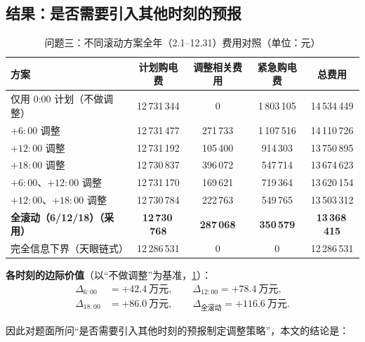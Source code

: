 \subsection{结果\nobreak：是否需要引入其他时刻的预报}

\begin{table}[htbp]
\centering
\caption{问题三\nobreak：不同滚动方案全年（2.1--12.31\nobreak）费用对照（单位\nobreak：元\nobreak）}
\label{tab:q3cmp}
\begin{tabular}{@{}lcccc@{}}
\toprule
方案 & 计划购电费 & 调整相关费用 & 紧急购电费 & 总费用 \\
\midrule
仅用 0:00 计划（不做调整\nobreak） & 12\,731\,344 & 0 & 1\,803\,105 & 14\,534\,449 \\
$+6{:}00$ 调整 & 12\,731\,477 & 271\,733 & 1\,107\,516 & 14\,110\,726 \\
$+12{:}00$ 调整 & 12\,731\,192 & 105\,400 & 914\,303 & 13\,750\,895 \\
$+18{:}00$ 调整 & 12\,730\,837 & 396\,072 & 547\,714 & 13\,674\,623 \\
$+6{:}00$\nobreak、$+12{:}00$ 调整 & 12\,731\,170 & 169\,621 & 719\,364 & 13\,620\,154 \\
$+12{:}00$\nobreak、$+18{:}00$ 调整 & 12\,730\,784 & 222\,763 & 549\,765 & 13\,503\,312 \\
\textbf{全滚动（6/12/18\nobreak）（采用\nobreak）} & \textbf{12\,730\,768} & \textbf{287\,068} & \textbf{350\,579} & \textbf{13\,368\,415} \\
完全信息下界（天眼链式\nobreak） & 12\,286\,531 & 0 & 0 & 12\,286\,531 \\
\bottomrule
\end{tabular}
\end{table}

\textbf{各时刻的边际价值}（以“不做调整\nobreak”为基准\nobreak，\cref{tab:q3cmp}\nobreak）\nobreak：
\begin{equation}
\begin{aligned}
\Delta_{6:00}&=+42.4\ \text{万元},\qquad
\Delta_{12:00}=+78.4\ \text{万元},\\
\Delta_{18:00}&=+86.0\ \text{万元},\qquad
\Delta_{\text{全滚动}}=+116.6\ \text{万元}.
\end{aligned}
\label{eq:marginal}
\end{equation}

因此对题面所问“是否需要引入其他时刻的预报制定调整策略\nobreak”\nobreak，本文的结论是\nobreak：

